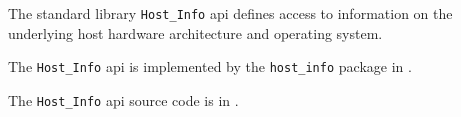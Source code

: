 
The standard library {\tt Host\_Info} api defines access to information on the underlying host hardware architecture and operating system.

The {\tt Host\_Info} api is implemented by the {\tt host\_info} package in .

The {\tt Host\_Info} api source code is in .





